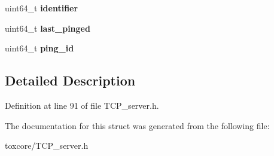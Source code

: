 \begin{DoxyCompactItemize}
\item 
\hypertarget{struct_t_c_p___secure___connection_ad1813f451cfaf8c9700e6329c5ea2f2b}{uint64\+\_\+t {\bfseries identifier}}\label{struct_t_c_p___secure___connection_ad1813f451cfaf8c9700e6329c5ea2f2b}

\item 
\hypertarget{struct_t_c_p___secure___connection_a4049204f6c392628d31be6c39f03e031}{uint64\+\_\+t {\bfseries last\+\_\+pinged}}\label{struct_t_c_p___secure___connection_a4049204f6c392628d31be6c39f03e031}

\item 
\hypertarget{struct_t_c_p___secure___connection_acec02fbdff648ca71a6d8e5a0d63d634}{uint64\+\_\+t {\bfseries ping\+\_\+id}}\label{struct_t_c_p___secure___connection_acec02fbdff648ca71a6d8e5a0d63d634}

\end{DoxyCompactItemize}


\subsection{Detailed Description}


Definition at line 91 of file T\+C\+P\+\_\+server.\+h.



The documentation for this struct was generated from the following file\+:\begin{DoxyCompactItemize}
\item 
toxcore/T\+C\+P\+\_\+server.\+h\end{DoxyCompactItemize}
